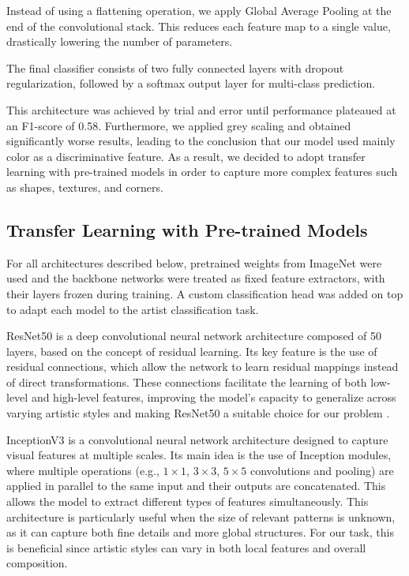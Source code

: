 \documentclass[12pt,a4paper]{article}
\begin{document}
Instead of using a flattening operation, we apply Global Average Pooling at the end of the convolutional stack. 
This reduces each feature map to a single value, drastically lowering the number of parameters.

The final classifier consists of two fully connected layers with dropout regularization, followed by a softmax output layer for multi-class prediction.

This architecture was achieved by trial and error until performance plateaued at an F1-score of 0.58. 
Furthermore, we applied grey scaling and obtained significantly worse results, leading to the conclusion that our model used mainly color as a discriminative feature.
As a result, we decided to adopt transfer learning with pre-trained models in order to capture more complex features such as shapes, textures, and corners. 


\subsection{Transfer Learning with Pre-trained Models}
For all architectures described below, pretrained weights from ImageNet were used and the backbone networks were treated as fixed feature extractors, with their layers frozen during training. 
A custom classification head was added on top to adapt each model to the artist classification task.



ResNet50 is a deep convolutional neural network architecture composed of 50 layers, based on the concept of residual learning. 
Its key feature is the use of residual connections, which allow the network to learn residual mappings instead of direct transformations. 
These connections facilitate the learning of both low-level and high-level features, improving the model’s capacity to generalize across varying artistic styles and making ResNet50 a suitable choice for our problem \cite{he2016deep}.




InceptionV3 is a convolutional neural network architecture designed to capture visual features at multiple scales. 
Its main idea is the use of Inception modules, where multiple operations (e.g., $1 \times 1$, $3 \times 3$, $5 \times 5$ convolutions and pooling) are applied in parallel to the same input and their outputs are concatenated. 
This allows the model to extract different types of features simultaneously.
This architecture is particularly useful when the size of relevant patterns is unknown, as it can capture both fine details and more global structures. 
For our task, this is beneficial since artistic styles can vary in both local features and overall composition\cite{szegedy2016rethinking}.
\end{document}
